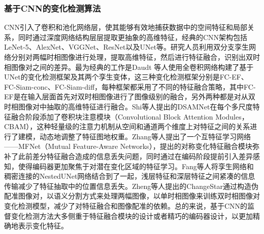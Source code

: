 \documentclass[lang=chs, degree=master, blindreview=false, adobe=false]{yanputhesis}
\begin{document}
\subsubsection{基于CNN的变化检测算法}
CNN引入了卷积和池化网络层，使其能够有效地捕获数据中的空间特征和局部关系，同时通过深度网络结构层层提取更抽象的高维特征，经典的CNN架构包括LeNet-5\cite{lecun1998lenet}、AlexNet\cite{krizhevsky2012alexnet}、VGGNet\cite{simonyan2014VGG}、ResNet\cite{He2015ResNet}以及UNet\cite{ronneberger2015Unet}等。研究人员利用双分支孪生网络分别对两幅时相图像进行处理，提取高维特征，然后进行特征融合，识别出双时相图像对之间的差异。最为经典的工作是Daudt 等人\cite{daudt2018FC-EF}使用全卷积网络构建了基于UNet的变化检测框架及其两个孪生变体，这三种变化检测框架分别是FC-EF、FC-Siam-conc、FC-Siam-diff，每种框架都采用了不同的特征融合策略，其中FC-EF是在输入层面首先对双时相图像进行了图像级别的融合，另外两种都是对从双时相图像对中抽取的高维特征进行融合。Shi等人\cite{shi2021DSAMNet}提出的DSAMNet在每个多尺度特征融合阶段添加了卷积块注意模块\cite{woo2018cbam}（Convolutional Block Attention Modules，CBAM），这种轻量级的注意力机制从空间和通道两个维度上对特征之间的关系进行了建模，动态地调整了特征图地权重。Zhang等人\cite{zhang2023MFNet}提出了一个互特征学习网络——MFNet（Mutual Feature-Aware Networks），提出的对称变化特征融合模块弥补了此前差分特征融合造成的信息丢失问题，同时通过在编码阶段提前引入差异感知，使得编码器更加聚焦于对潜在变化区域的特征学习。Fang等人\cite{fang2021SNUNet}将孪生网络和稠密连接的NestedUNet网络\cite{zhou2018unet++}结合到了一起，浅层特征和深层特征之间紧凑的信息传输减少了特征抽取中的位置信息丢失。Zheng等人提出的ChangeStar\cite{zheng2021changestar}通过构造伪配准图像对，以语义分割方式来处理两幅图像，以单时相图像来训练双时相图像对变化检测模型，减少了对特征融合和图像配准的依赖。总的来说，基于CNN的监督变化检测方法大多侧重于特征融合模块的设计或者精巧的编码器设计，以更加精确地表示变化特征。
\end{document}

